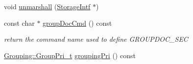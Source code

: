 \begin{DoxyCompactItemize}
\item 
void \hyperlink{class_entry_a0c2561181c63aad06955b06211667683}{unmarshall} (\hyperlink{class_storage_intf}{Storage\+Intf} $\ast$)
\item 
const char $\ast$ \hyperlink{class_entry_a1ad3fe498337128e3e89c72dd5818e3b}{group\+Doc\+Cmd} () const 
\begin{DoxyCompactList}\small\item\em return the command name used to define G\+R\+O\+U\+P\+D\+O\+C\+\_\+\+S\+E\+C \end{DoxyCompactList}\item 
\hyperlink{struct_grouping_a9f0ec5ab376b083ebe3274ea79fd2d70}{Grouping\+::\+Group\+Pri\+\_\+t} \hyperlink{class_entry_ab8da769425ff6b5b1730077e302356ef}{grouping\+Pri} () const 
\end{DoxyCompactItemize}
